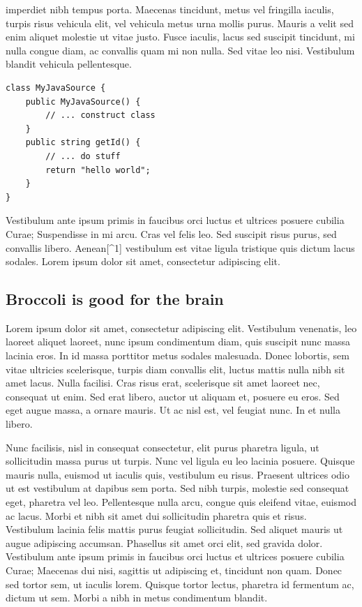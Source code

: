 imperdiet nibh tempus porta. Maecenas tincidunt, metus vel fringilla
iaculis, turpis risus vehicula elit, vel vehicula metus urna mollis
purus. Mauris a velit sed enim aliquet molestie ut vitae justo. Fusce
iaculis, lacus sed suscipit tincidunt, mi nulla congue diam, ac
convallis quam mi non nulla. Sed vitae leo nisi. Vestibulum blandit
vehicula pellentesque.

\begin{minipage}{0.95\textwidth}\begin{lstlisting}
class MyJavaSource {
    public MyJavaSource() {
        // ... construct class
    }
    public string getId() {
        // ... do stuff
        return "hello world";
    }
}
\end{lstlisting}\end{minipage}

Vestibulum ante ipsum primis in faucibus orci luctus et ultrices posuere
cubilia Curae; Suspendisse in mi arcu. Cras vel felis leo. Sed suscipit
risus purus, sed convallis libero. Aenean{[}\^{}1{]} vestibulum est
vitae ligula tristique quis dictum lacus sodales. Lorem ipsum dolor sit
amet, consectetur adipiscing elit.

\subsection{Broccoli is good for the
brain}\label{broccoli-is-good-for-the-brain}

Lorem ipsum dolor sit amet, consectetur adipiscing elit. Vestibulum
venenatis, leo laoreet aliquet laoreet, nunc ipsum condimentum diam,
quis suscipit nunc massa lacinia eros. In id massa porttitor metus
sodales malesuada. Donec lobortis, sem vitae ultricies scelerisque,
turpis diam convallis elit, luctus mattis nulla nibh sit amet lacus.
Nulla facilisi. Cras risus erat, scelerisque sit amet laoreet nec,
consequat ut enim. Sed erat libero, auctor ut aliquam et, posuere eu
eros. Sed eget augue massa, a ornare mauris. Ut ac nisl est, vel feugiat
nunc. In et nulla libero.

Nunc facilisis, nisl in consequat consectetur, elit purus pharetra
ligula, ut sollicitudin massa purus ut turpis. Nunc vel ligula eu leo
lacinia posuere. Quisque mauris nulla, euismod ut iaculis quis,
vestibulum eu risus. Praesent ultrices odio ut est vestibulum at dapibus
sem porta. Sed nibh turpis, molestie sed consequat eget, pharetra vel
leo. Pellentesque nulla arcu, congue quis eleifend vitae, euismod ac
lacus. Morbi et nibh sit amet dui sollicitudin pharetra quis et risus.
Vestibulum lacinia felis mattis purus feugiat sollicitudin. Sed aliquet
mauris ut augue adipiscing accumsan. Phasellus sit amet orci elit, sed
gravida dolor. Vestibulum ante ipsum primis in faucibus orci luctus et
ultrices posuere cubilia Curae; Maecenas dui nisi, sagittis ut
adipiscing et, tincidunt non quam. Donec sed tortor sem, ut iaculis
lorem. Quisque tortor lectus, pharetra id fermentum ac, dictum ut sem.
Morbi a nibh in metus condimentum blandit.

